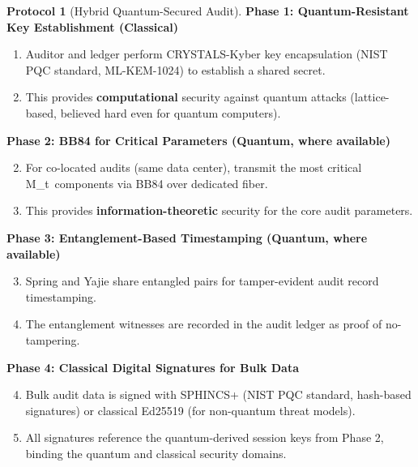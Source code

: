\documentclass[11pt,a4paper]{article}
\theoremstyle{plain}
\theoremstyle{definition}
\newtheorem{protocol}[theorem]{Protocol}
\theoremstyle{remark}
\newcommand{\Mt}{M_t}
\begin{document}
\begin{protocol}[Hybrid Quantum-Secured Audit]\label{prot:hybrid}
\textbf{Phase 1: Quantum-Resistant Key Establishment (Classical)}

\begin{enumerate}[label=1.\arabic*]
  \item Auditor and ledger perform CRYSTALS-Kyber key encapsulation
        (NIST PQC standard, ML-KEM-1024) to establish a shared secret.
  \item This provides \textbf{computational} security against quantum
        attacks (lattice-based, believed hard even for quantum computers).
\end{enumerate}

\medskip
\noindent\textbf{Phase 2: BB84 for Critical Parameters (Quantum, where available)}

\begin{enumerate}[label=2.\arabic*]
  \setcounter{enumi}{1}
  \item For co-located audits (same data center), transmit the most
        critical \Mt\ components via BB84 over dedicated fiber.
  \item This provides \textbf{information-theoretic} security for the
        core audit parameters.
\end{enumerate}

\medskip
\noindent\textbf{Phase 3: Entanglement-Based Timestamping (Quantum, where available)}

\begin{enumerate}[label=3.\arabic*]
  \setcounter{enumi}{2}
  \item Spring and Yajie share entangled pairs for tamper-evident
        audit record timestamping.
  \item The entanglement witnesses are recorded in the audit ledger
        as proof of no-tampering.
\end{enumerate}

\medskip
\noindent\textbf{Phase 4: Classical Digital Signatures for Bulk Data}

\begin{enumerate}[label=4.\arabic*]
  \setcounter{enumi}{3}
  \item Bulk audit data is signed with SPHINCS+ (NIST PQC standard,
        hash-based signatures) or classical Ed25519 (for non-quantum
        threat models).
  \item All signatures reference the quantum-derived session keys from
        Phase 2, binding the quantum and classical security domains.
\end{enumerate}
\end{protocol}
\end{document}
